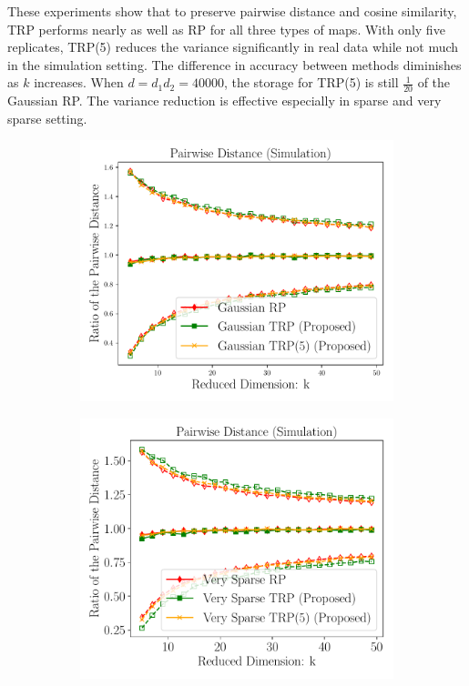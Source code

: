 These experiments show that to preserve pairwise distance and cosine similarity,
TRP performs nearly as well as RP for all three types of maps.
With only five replicates, TRP(5) reduces the variance significantly in real data while not much in the simulation setting.
The difference in accuracy between methods diminishes as $k$ increases.
When $d = d_1d_2 = 40000$, the storage for TRP(5) is still $\frac{1}{20}$ of the Gaussian RP.
The variance reduction is effective especially in sparse and very sparse setting.
\begin{figure}[H]
	\centering
	\begin{subfigure}{0.24\textwidth}
		\includegraphics[scale = 0.22]{figure/dist_g_d2500.pdf}
	\end{subfigure}
	\begin{subfigure}{0.24\textwidth}
		\includegraphics[scale = 0.22]{figure/dist_sp1_d2500.pdf}

\end{subfigure}
\end{figure}

